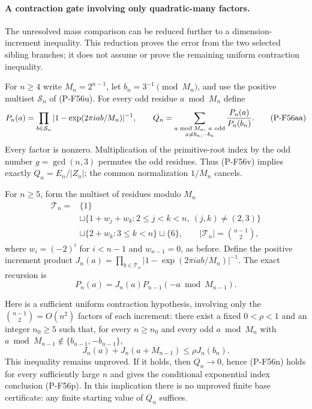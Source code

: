 \documentclass[11pt,a4paper]{article}
\begin{document}
\paragraph{A contraction gate involving only quadratic-many factors.}
The unresolved mass comparison can be reduced further to a
dimension-increment inequality. This reduction proves the error
from the two selected sibling branches; it does not assume or
prove the remaining uniform contraction inequality.

For $n\ge4$ write $M_n=2^{n-1}$, let
$b_n=3^{-1}\pmod {M_n}$, and use the positive multiset
$\mathcal S_n$ of (P-F56u). For every odd residue $a\bmod M_n$
define
\[
 P_n(a)=
 \prod_{b\in\mathcal S_n}
       |1-\exp(2\pi iab/M_n)|^{-1},\qquad
 Q_n=\sum_{\substack{a\bmod M_n,\ a\ {\rm odd}\\
                               a\ne b_n,-b_n}}
                              \frac{P_n(a)}{P_n(b_n)}.
 \tag{P-F56aa}
\]
Every factor is nonzero. Multiplication of the primitive-root
index by the odd number $g=\gcd(n,3)$ permutes the odd residues.
Thus (P-F56v) implies exactly $Q_n=E_n/|Z_n|$; the common
normalization $1/M_n$ cancels.

For $n\ge5$, form the multiset of residues modulo $M_n$
\[
 \begin{split}
 \mathcal T_n={}&\{1\}\\
 &\sqcup\{1+w_j+w_k:2\le j<k<n,\ (j,k)\ne(2,3)\}\\
 &\sqcup\{2+w_k:3\le k<n\}\sqcup\{6\},
 \qquad |\mathcal T_n|=\binom{n-1}2,
 \end{split}
 \tag{P-F56ab}
\]
where $w_i=(-2)^i$ for $i<n-1$ and $w_{n-1}=0$,
as before. Define the positive increment product
$J_n(a)=\prod_{b\in\mathcal T_n}
 |1-\exp(2\pi iab/M_n)|^{-1}$.
The exact recursion is
\[
             P_n(a)=J_n(a)P_{n-1}(-a\bmod M_{n-1}).
 \tag{P-F56ac}
\]

Here is a sufficient uniform contraction hypothesis, involving
only the $\binom{n-1}2=O(n^2)$ factors of each increment:
there exist a fixed $0<\rho<1$ and an integer $n_0\ge5$ such that,
for every $n\ge n_0$ and every odd $a\bmod M_n$ with
$a\bmod M_{n-1}\notin\{b_{n-1},-b_{n-1}\}$,
\[
 J_n(a)+J_n(a+M_{n-1})\le \rho J_n(b_n).
 \tag{P-F56ad}
\]
This inequality remains unproved. If it holds, then
$Q_n\longrightarrow0$, hence (P-F56n) holds for every
sufficiently large $n$ and gives the conditional exponential
index conclusion (P-F56p).
In this implication there is no unproved finite base
certificate: any finite starting value of $Q_n$ suffices.
\end{document}
